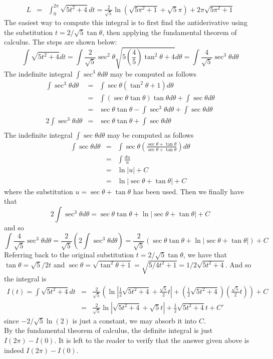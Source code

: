 \documentclass[12pt]{amsbook}
\begin{document}
\begin{enumerate}
  \begin{eqnarray*}
  L&=&\int_0^{2\pi}\sqrt{5t^2+4}dt=\frac{2}{\sqrt{5}}\ln(\sqrt{5\pi^2+1}+\sqrt{5}\pi)+2\pi\sqrt{5\pi^2+1}
  \end{eqnarray*}
  The easiest way to compute this integral is to first find the antiderivative using the substitution $t=2/\sqrt{5}\tan \theta$, then applying the fundamental theorem of calculus. The steps are shown below:
  $$ \int \sqrt{5t^2+4}dt = \int \frac{2}{\sqrt{5}}\sec^2 \theta \sqrt{5(\frac{4}{5})\tan^2\theta+4}d\theta=\int \frac{4}{\sqrt{5}} \sec^3\theta d\theta$$
  The indefinite integral $\int \sec^3\theta d\theta$ may be computed as follows
  \begin{eqnarray*}
  \int \sec^3 \theta d\theta &=& \int \sec \theta (\tan^2\theta + 1) d\theta\\
  &=& \int (\sec \theta \tan\theta) \tan\theta d\theta + \int \sec \theta d\theta \\
  &=& \sec \theta \tan \theta - \int \sec^3\theta d\theta + \int \sec \theta d\theta \\ 
  2\int \sec^3 \theta d\theta &=& \sec \theta \tan \theta + \int \sec \theta d\theta \\
  \end{eqnarray*}
  The indefinite integral $\int \sec \theta d\theta$ may be computed as follows
  \begin{eqnarray*}
  \int \sec \theta d\theta &=& \int \sec \theta (\frac{\sec \theta + \tan \theta}{\sec \theta + \tan \theta}) d\theta\\
  &=& \int \frac{du}{u}\\
  &=&\ln|u|+C\\
  &=&\ln|\sec \theta + \tan \theta| +C
  \end{eqnarray*}
  where the substitution $u=\sec \theta + \tan \theta$ has been used. Then we finally have that
  $$2\int \sec^3 \theta d\theta = \sec \theta \tan \theta + \ln|\sec \theta + \tan \theta| +C$$
  and so
  $$\int \frac{4}{\sqrt{5}}\sec^3\theta d\theta=\frac{2}{\sqrt{5}}(2\int \sec^3 \theta d\theta)=\frac{2}{\sqrt{5}}(\sec \theta \tan \theta + \ln|\sec \theta + \tan \theta|)+C$$
  Referring back to the original substitution $t=2/\sqrt{5}\tan \theta$, we have that $\tan \theta = \sqrt{5}/2t$ and $\sec \theta = \sqrt{\tan^2\theta+1}=\sqrt{5/4t^2+1}=1/2\sqrt{5t^2+4}$. And so the integral is
  \begin{eqnarray*}
  I(t)=\int \sqrt{5t^2+4}dt&=&\frac{2}{\sqrt{5}}(\ln|\frac{1}{2}\sqrt{5t^2+4}+\frac{\sqrt{5}}{2}t|+(\frac{1}{2}\sqrt{5t^2+4})(\frac{\sqrt{5}}{2}t))+C\\
  &=&\frac{2}{\sqrt{5}}\ln|\sqrt{5t^2+4}+\sqrt{5}t|+\frac{1}{2}\sqrt{5t^2+4}t+C'
  \end{eqnarray*}
  since $-2/\sqrt{5}\ln(2)$ is just a constant, we may absorb it into $C$. 
  \\
  By the fundamental theorem of calculus, the definite integral is just $I(2\pi)-I(0)$. It is left to the reader to verify that the answer given above is indeed $I(2\pi)-I(0)$.
\end{enumerate}
\end{document}
